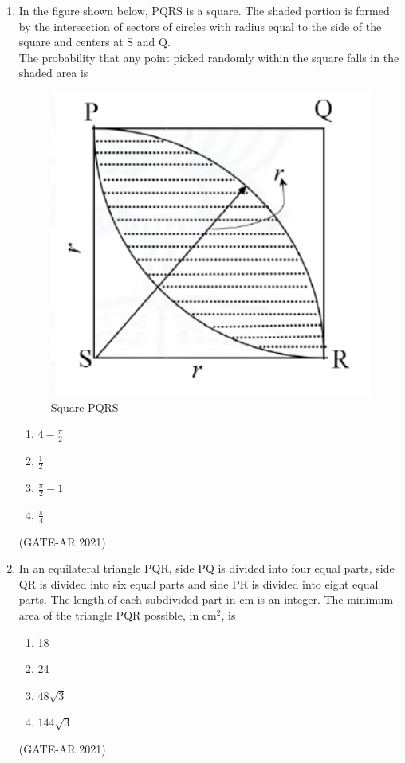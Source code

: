 \documentclass[a4paper,10pt]{article}
\begin{document}
\begin{enumerate}
    \item In the figure shown below, PQRS is a square. The shaded portion is formed by the intersection of sectors of circles with radius equal to the side of the square and centers at S and Q. \\
    The probability that any point picked randomly within the square falls in the shaded area is \\
    \begin{figure}[h!]
    \centering
    \includegraphics[width=0.5\columnwidth]{figs/06.jpg}
    \caption{Square PQRS}
    \label{fig:Img06}
    \end{figure}
    \begin{multicols}{4}
    \begin{enumerate}
        \item $4 - \frac{\pi}{2}$
        \item $\frac{1}{2}$
        \item $\frac{\pi}{2} - 1$
        \item $\frac{\pi}{4}$
    \end{enumerate}
    \end{multicols}
    \hfill (GATE-AR 2021)

    \item In an equilateral triangle PQR, side PQ is divided into four equal parts, side QR is divided into six equal parts and side PR is divided into eight equal parts. The length of each subdivided part in cm is an integer. The minimum area of the triangle PQR possible, in cm$^2$, is
    \begin{multicols}{4}
    \begin{enumerate}
        \item 18
        \item 24
        \item $48\sqrt{3}$
        \item $144\sqrt{3}$
    \end{enumerate}
    \end{multicols}
    \hfill (GATE-AR 2021)
    

\end{enumerate}
\end{document}
